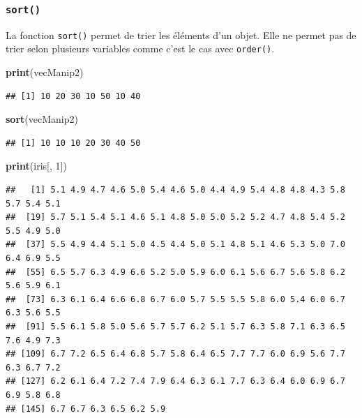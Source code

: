 \documentclass[
]{book}
\newenvironment{Shaded}{\begin{snugshade}}{\end{snugshade}}
\newcommand{\DecValTok}[1]{\textcolor[rgb]{0.00,0.00,0.81}{#1}}
\newcommand{\KeywordTok}[1]{\textcolor[rgb]{0.13,0.29,0.53}{\textbf{#1}}}
\newcommand{\NormalTok}[1]{#1}
\begin{document}
\hypertarget{l015sort}{%
\subsubsection{\texorpdfstring{\texttt{sort()}}{sort()}}\label{l015sort}}

La fonction \texttt{sort()} permet de trier les éléments d'un objet. Elle ne permet pas de trier selon plusieurs variables comme c'est le cas avec \texttt{order()}.

\begin{Shaded}
\begin{Highlighting}[]
\KeywordTok{print}\NormalTok{(vecManip2)}
\end{Highlighting}
\end{Shaded}

\begin{verbatim}
## [1] 10 20 30 10 50 10 40
\end{verbatim}

\begin{Shaded}
\begin{Highlighting}[]
\KeywordTok{sort}\NormalTok{(vecManip2)}
\end{Highlighting}
\end{Shaded}

\begin{verbatim}
## [1] 10 10 10 20 30 40 50
\end{verbatim}

\begin{Shaded}
\begin{Highlighting}[]
\KeywordTok{print}\NormalTok{(iris[, }\DecValTok{1}\NormalTok{])}
\end{Highlighting}
\end{Shaded}

\begin{verbatim}
##   [1] 5.1 4.9 4.7 4.6 5.0 5.4 4.6 5.0 4.4 4.9 5.4 4.8 4.8 4.3 5.8 5.7 5.4 5.1
##  [19] 5.7 5.1 5.4 5.1 4.6 5.1 4.8 5.0 5.0 5.2 5.2 4.7 4.8 5.4 5.2 5.5 4.9 5.0
##  [37] 5.5 4.9 4.4 5.1 5.0 4.5 4.4 5.0 5.1 4.8 5.1 4.6 5.3 5.0 7.0 6.4 6.9 5.5
##  [55] 6.5 5.7 6.3 4.9 6.6 5.2 5.0 5.9 6.0 6.1 5.6 6.7 5.6 5.8 6.2 5.6 5.9 6.1
##  [73] 6.3 6.1 6.4 6.6 6.8 6.7 6.0 5.7 5.5 5.5 5.8 6.0 5.4 6.0 6.7 6.3 5.6 5.5
##  [91] 5.5 6.1 5.8 5.0 5.6 5.7 5.7 6.2 5.1 5.7 6.3 5.8 7.1 6.3 6.5 7.6 4.9 7.3
## [109] 6.7 7.2 6.5 6.4 6.8 5.7 5.8 6.4 6.5 7.7 7.7 6.0 6.9 5.6 7.7 6.3 6.7 7.2
## [127] 6.2 6.1 6.4 7.2 7.4 7.9 6.4 6.3 6.1 7.7 6.3 6.4 6.0 6.9 6.7 6.9 5.8 6.8
## [145] 6.7 6.7 6.3 6.5 6.2 5.9
\end{verbatim}
\end{document}
